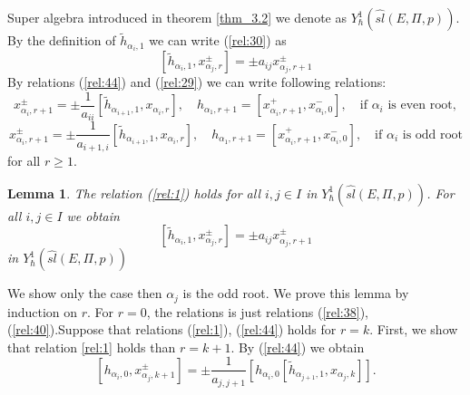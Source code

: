 \documentclass[english]{elsarticle}
\newtheorem{lemma}{Lemma}[section]
\numberwithin{equation}{section}
\begin{document}
Super algebra introduced in theorem \ref{thm_3.2} we denote as $Y_{\hbar}^1(\hat{sl}(E,\Pi,p))$. By the definition of $\tilde{h}_{\alpha_i,1}$ we can write (\ref{rel:30}) as
\begin{equation}
\label{rel:44}
    [\tilde{h}_{\alpha_i,1},x_{\alpha_j,r}^{\pm}]=\pm a_{ij}x_{\alpha_j,r+1}^{\pm}
\end{equation}
By relations (\ref{rel:44}) and (\ref{rel:29}) we can write following relations:
\begin{equation}
    x_{\alpha_i,r+1}^{\pm}=\pm \frac{1}{a_{ii}}[\tilde{h}_{\alpha_{i+1},1},x_{\alpha_i,r}], \quad h_{\alpha_1,r+1}=[x_{\alpha_i,r+1}^{+},x_{\alpha_i,0}^{-}], \quad \text{if $\alpha_i$ is even root},
\end{equation}
\begin{equation}
\label{rel:46}
    x_{\alpha_i,r+1}^{\pm}=\pm \frac{1}{a_{i+1,i}}[\tilde{h}_{\alpha_{i+1},1},x_{\alpha_i,r}], \quad h_{\alpha_1,r+1}=[x_{\alpha_i,r+1}^{+},x_{\alpha_i,0}^{-}], \quad \text{if $\alpha_i$ is odd root}
\end{equation}
for all $r \geq 1$.

\begin{lemma} \label{lem:1}
The relation (\ref{rel:1}) holds for all $i,j\in I$ in $Y_{\hbar}^1(\hat{sl}(E,\Pi,p))$. For all $i,j\in I$ we obtain
\begin{equation}
\label{rel:47}
    [\tilde{h}_{\alpha_i,1},x_{\alpha_j,r}^{\pm}]=\pm a_{ij}x_{\alpha_j,r+1}^{\pm}
\end{equation}
in $Y_{\hbar}^1(\hat{sl}(E,\Pi,p))$\\
\end{lemma}
We show only the case then $\alpha_j$ is the odd root. We prove this lemma by induction on $r$. For $r=0$, the relations is just relations (\ref{rel:38}), (\ref{rel:40}).Suppose that relations (\ref{rel:1}), (\ref{rel:44}) holds for $r=k$. First, we show that relation \ref{rel:1} holds than $r=k+1$. By (\ref{rel:44}) we obtain
\begin{equation}
\label{rel:48}
    [h_{\alpha_i,0},x_{\alpha_j,k+1}^{\pm}]=\pm \frac{1}{a_{j,j+1}}[h_{\alpha_i,0}[\tilde{h}_{\alpha_{j+1},1},x_{\alpha_j,k}]].
\end{equation}
\end{document}
